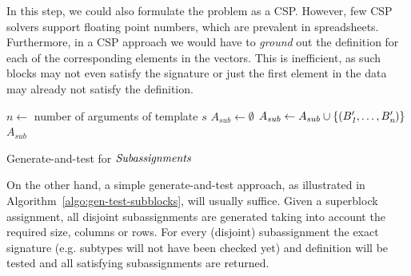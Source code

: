 In this step, we could also formulate the problem as a CSP. %
However, few CSP solvers support floating point numbers, which are prevalent in spreadsheets.
Furthermore, in a CSP approach we would have to \textit{ground} out the definition for each of the corresponding elements in the vectors.
This is inefficient, as such blocks may not even satisfy the signature or just the first element in the data may already not satisfy the definition.

\begin{algorithm}[tbh]
  \begin{algorithmic}
    \footnotesize
    \State $n \gets$ number of arguments of template $s$
    \State $A_{sub} \gets \emptyset$
        \State $A_{sub} \gets A_{sub} \cup \{ (B_{\textit{1}}', \dots, B_{\textit{n}}') \}$
      \EndIf
    \EndFor
\Return $A_{sub}$
\EndProcedure
\end{algorithmic}
\caption{Generate-and-test for $\textit{Subassignments}$}
\label{algo:gen-test-subblocks}
\end{algorithm}


On the other hand, a simple generate-and-test approach, as illustrated in Algorithm~\ref{algo:gen-test-subblocks}, will usually suffice.
Given a superblock assignment, all disjoint subassignments are generated taking into account the required size, columns or rows.
For every (disjoint) subassignment the exact signature (e.g. subtypes will not have been checked yet) and definition will be tested and all satisfying subassignments are returned.


